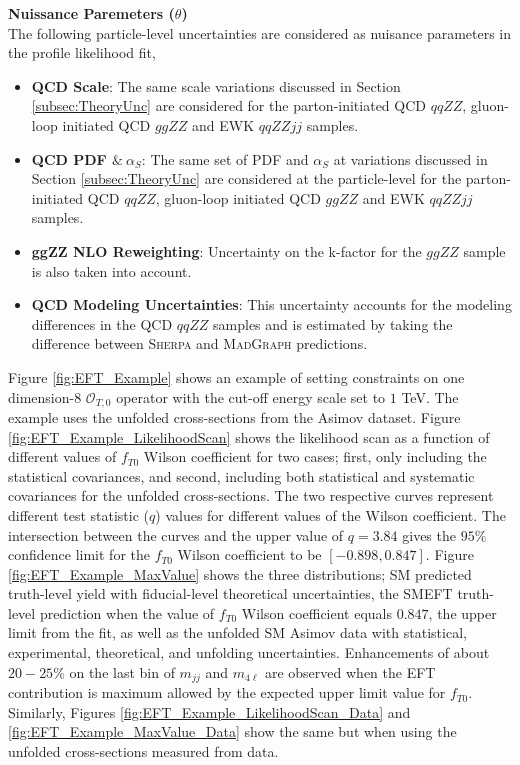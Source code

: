 \textbf{Nuissance Paremeters ($\theta$)} \\
The following particle-level uncertainties are considered as nuisance parameters in the profile likelihood fit,
\begin{itemize}
    \item{\textbf{QCD Scale}: The same scale variations discussed in Section \ref{subsec:TheoryUnc} are considered for the parton-initiated QCD $qqZZ$, gluon-loop initiated QCD $ggZZ$ and EWK $qqZZjj$ samples.} 
    \item{\textbf{QCD PDF $\& ~ \alpha_{S}$}: The same set of PDF and $\alpha_{S}$ at variations discussed in Section \ref{subsec:TheoryUnc} are considered at the particle-level for the parton-initiated QCD $qqZZ$, gluon-loop initiated QCD $ggZZ$ and EWK $qqZZjj$ samples. }
    \item{\textbf{ggZZ NLO Reweighting}: Uncertainty on the k-factor for the $ggZZ$ sample is also taken into account. }
    \item{\textbf{QCD Modeling Uncertainties}: This uncertainty accounts for the modeling differences in the QCD $qqZZ$ samples and is estimated by taking the difference between \textsc{Sherpa} and \textsc{MadGraph} predictions.} 
\end{itemize}

Figure \ref{fig:EFT_Example} shows an example of setting constraints on one dimension-8 $\mathcal{O}_{T,0}$ operator with the cut-off energy scale set to $1$ TeV. The example uses the unfolded cross-sections from the Asimov dataset. Figure \ref{fig:EFT_Example_LikelihoodScan} shows the likelihood scan as a function of different values of $f_{T0}$ Wilson coefficient for two cases; first, only including the statistical covariances, and second, including both statistical and systematic covariances for the unfolded cross-sections. The two respective curves represent different test statistic ($q$) values for different values of the Wilson coefficient. The intersection between the curves and the upper value of $q=3.84$ gives the $95\%$ confidence limit for the $f_{T0}$ Wilson coefficient to be $[-0.898,0.847]$. Figure \ref{fig:EFT_Example_MaxValue} shows the three distributions; SM predicted truth-level yield with fiducial-level theoretical uncertainties, the SMEFT truth-level prediction when the value of $f_{T0}$ Wilson coefficient equals $0.847$, the upper limit from the fit, as well as the unfolded SM Asimov data with statistical, experimental, theoretical, and unfolding uncertainties. Enhancements of about $20-25\%$ on the last bin of $m_{jj}$ and $m_{4\ell}$ are observed when the EFT contribution is maximum allowed by the expected upper limit value for $f_{T0}$. Similarly, Figures \ref{fig:EFT_Example_LikelihoodScan_Data} and \ref{fig:EFT_Example_MaxValue_Data} show the same but when using the unfolded cross-sections measured from data. 

